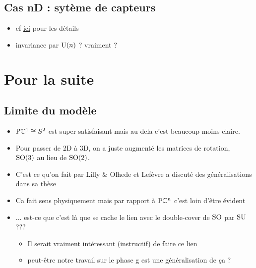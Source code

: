 \subsection{\todo Cas nD : sytème de capteurs} \label{subsec:ex-nD}

\begin{itemize}
	
	\item cf \href{https://theses.hal.science/tel-00199884}{ici} pour les détails
	
	\item invariance par $\text{\normalfont U}(n)$ ? vraiment ?
\end{itemize}



\section{\todo Pour la suite}\label{sec:2lasuite}


\subsection{\todo Limite du modèle}\label{subsec:limite2model}

\begin{itemize}
	
	\item $\text{\normalfont P}\mathbb{C}^{1} \cong S^2$ est super satisfaisant mais au dela c'est beaucoup moins claire.
	
	\item Pour passer de 2D à 3D, on a juste augmenté les matrices de rotation, \ie~$\text{\normalfont SO}(3)$ au lieu de $\text{\normalfont SO}(2)$. 
	
	\item C'est ce qu'on fait par Lilly \& Olhede \cite{lilly_modulated_2011} et Lefèvre a discuté des généralisations dans sa thèse \cite{lefevre_polarization_2021}
	
	\item Ca fait sens physiquement mais par rapport à $\text{\normalfont P}\mathbb{C}^{n}$ c'est loin d'être évident
	
	\item ... est-ce que c'est là que se cache le lien avec le double-cover de $\text{\normalfont SO}$ par $\text{\normalfont SU}$ ???
	\begin{itemize}
		\item Il serait vraiment intéressant (instructif) de faire ce lien 
		
		\item peut-être notre travail sur le phase g est une généralisation de ça ? 
	\end{itemize}
	
\end{itemize}




